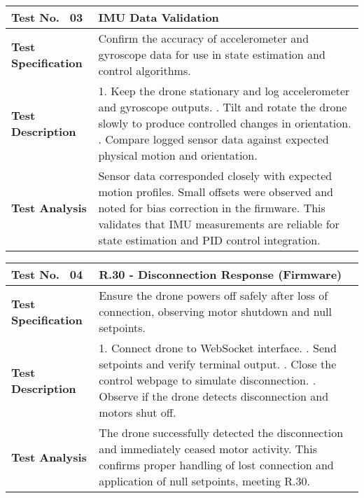 \begin{table}[H]
\centering
\renewcommand{\arraystretch}{1.2}
\begin{tabular}{|p{3.5cm}|p{12cm}|}
\hline
\textbf{Test No. \, 03} & \textbf{IMU Data Validation} \\ \hline
\textbf{Test Specification} & 
Confirm the accuracy of accelerometer and gyroscope data for use in state estimation and control algorithms. \\ \hline
\textbf{Test Description} & 
1. Keep the drone stationary and log accelerometer and gyroscope outputs. \newline
2. Tilt and rotate the drone slowly to produce controlled changes in orientation. \newline
3. Compare logged sensor data against expected physical motion and orientation. \\ \hline
\textbf{Test Analysis} & 
Sensor data corresponded closely with expected motion profiles. Small offsets were observed and noted for bias correction in the firmware. This validates that IMU measurements are reliable for state estimation and PID control integration. \\ \hline
\end{tabular}
\end{table}

\begin{table}[H]
\centering
\renewcommand{\arraystretch}{1.2}
\begin{tabular}{|p{3.5cm}|p{12cm}|}
\hline
\textbf{Test No. \, 04} & \textbf{R.30 - Disconnection Response} (Firmware) \\ \hline
\textbf{Test Specification} & 
Ensure the drone powers off safely after loss of connection, observing motor shutdown and null setpoints. \\ \hline
\textbf{Test Description} & 
1. Connect drone to WebSocket interface. \newline
2. Send setpoints and verify terminal output. \newline
3. Close the control webpage to simulate disconnection. \newline
4. Observe if the drone detects disconnection and motors shut off. \\ \hline
\textbf{Test Analysis} & 
The drone successfully detected the disconnection and immediately ceased motor activity. This confirms proper handling of lost connection and application of null setpoints, meeting R.30. \\ \hline
\end{tabular}
\end{table}


